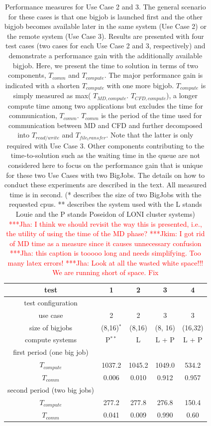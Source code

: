 \documentclass[conference,final]{IEEEtran}
\newcommand{\jhanote}[1]{ {\textcolor{red} { ***Jha: #1 }}}
\newcommand{\Jkimnote}[1]{ {\textcolor{red} { ***Jkim: #1 }}}
\newcommand{\jhanote}[1]{}
\newcommand{\Jkimnote}[1]{}
\begin{document}
\begin{table}[!h]
\begin{center}
  \caption{\small Performance measures for Use Case 2 and 3.  The
    general scenario for these cases is that one bigjob is launched
    first and the other bigjob becomes available later in the same
    system (Use Case 2) or the remote system (Use Case 3).  Results
    are presented with four test cases (two cases for each Use Case 2
    and 3, respectively) and demonstrate a performance gain with the
    additionally available bigjob. Here, we present the time to
    solution in terms of two components, ${T_{comm}}$ and
    ${T_{compute}}$. The major performance gain is indicated with a
    shorten ${T_{compute}}$ with one more bigjob.  ${T_{compute}}$ is
    simply measured as max( ${T _{MD,compute}}$. ${T_{CFD,
        compute}}$), a longer compute time among two applications but
    excludes the time for communication, ${T_{comm}}$.  ${T_{comm}}$
    is the period of the time used for communication between MD and
    CFD and further decomposed into ${T_{read/write}}$ and
    ${T_{file_transfer}}$.  Note that the latter is only required with
    Use Case 3.  Other components contributing to the time-to-solution
    such as the waiting time in the queue are not considered here to
    focus on the performance gain that is unique for these two Use
    Cases with two BigJobs.  The details on how to conduct these
    experiments are described in the text.  All measured time is in
    second. (* describes the size of two BigJobs with the requested cpus. ** describes the system used with the L stands Louie and the P stands Poseidon of LONI cluster systems)
    \jhanote{I think we should revisit the way this is
      presented, i.e., the utility of using the time of the MD phase?}
    \Jkimnote{I got rid of MD time as a measure since it causes
      unnecessary confusion} \jhanote{this caption is tooooo long and
      needs simplifying. Too many latex errors!} \jhanote{Look at all
      the wasted white space!!! We are running short of space. Fix}}
\label{table:TwoBigJobs}
\begin{tabular}{ c | c  c  c  c}
\hline
test & 1 & 2 & 3 & 4  \\

\hline
test configuration &&& \\
use case & 2 & 2 &3 &3 \\

size of bigjobs & (8,16)${^*}$  & (8,16) & (8, 16) & (16,32) \\
compute systems & P${^{**}}$  & L  &  L + P & L + P \\
\hline
first period (one big job) &   & & & \\
${T_{compute}}$ & 1037.2& 1045.2 & 1049.0 & 534.2\\
${T_{comm}}$ & 0.006 & 0.010 & 0.912 & 0.957 \\
\hline
second period (two big jobs)&   & & & \\
${T_{compute}}$ & 277.2 & 277.8& 276.8 & 150.4 \\
${T_{comm}}$ & 0.041 & 0.009 &  0.990 & 0.60 \\
\hline





\end{tabular}
\end{center}
\end{table}
\end{document}
